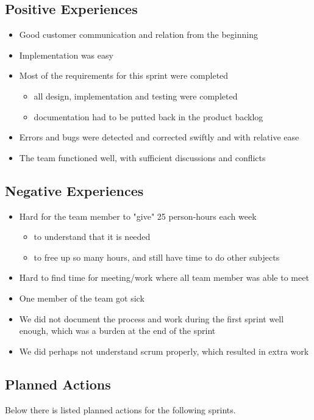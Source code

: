 \subsection{Positive Experiences}
\begin{itemize}
	\item Good customer communication and relation from the beginning
	\item Implementation was easy
	\item Most of the requirements for this sprint were completed
	\begin{itemize} 
		\item all design, implementation and testing were completed
		\item documentation had to be putted back in the product backlog 
	\end{itemize}
	\item Errors and bugs were detected and corrected swiftly and with relative ease
	\item The team functioned well, with sufficient discussions and conflicts
\end{itemize}

\subsection{Negative Experiences}
\begin{itemize}
	\item Hard for the team member to "give" 25 person-hours each week
	\begin{itemize}
		\item to understand that it is needed
		\item to free up so many hours, and still have time to do other subjects
	\end{itemize}
	\item Hard to find time for meeting/work where all team member was able to meet
	\item One member of the team got sick
	\item We did not document the process and work during the first sprint well enough, which was a burden at the end of the sprint
	\item We did perhaps not understand \Gls{scrum} properly, which resulted in extra work
\end{itemize}

\subsection{Planned Actions}
Below there is listed planned actions for the following sprints.

